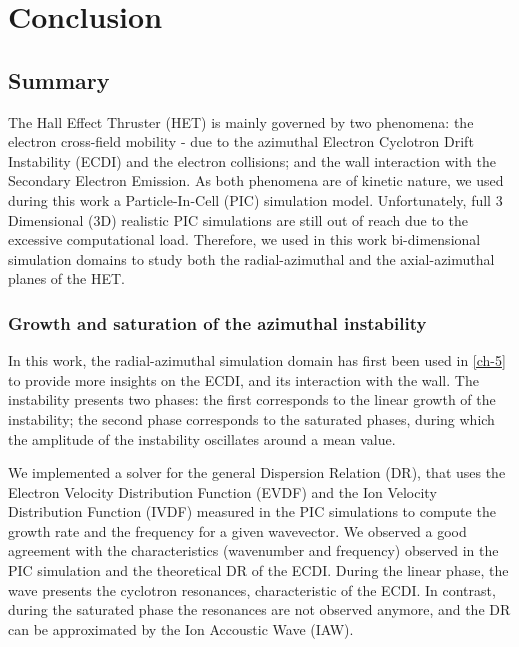 
\chapter{Conclusion}
\label{ch-conclusion}

\section{Summary}

The Hall Effect Thruster (HET) is mainly governed by two phenomena\string: the electron cross-field mobility - due to the azimuthal Electron Cyclotron Drift Instability (ECDI) and the electron collisions; and the wall interaction with the Secondary Electron Emission.
As both phenomena are of kinetic nature, we used during this work a Particle-In-Cell (PIC) simulation model.
Unfortunately, full 3 Dimensional (3D) realistic PIC simulations are still out of reach due to the excessive computational load.
Therefore, we used in this work bi-dimensional simulation domains to study both the radial-azimuthal and the axial-azimuthal planes of the HET.

\subsection{Growth and saturation of the azimuthal instability}

In this work, the radial-azimuthal simulation domain has first been used in \cref{ch-5} to provide more insights on the \ac{ECDI}, and its interaction with the wall.
The instability presents two phases\string: the first corresponds to the linear growth of the instability; the second phase corresponds to the saturated phases, during which the amplitude of the instability oscillates around a mean value.

We implemented a solver for the general Dispersion Relation (DR), that uses the Electron Velocity Distribution Function (EVDF) and the Ion Velocity Distribution Function (IVDF) measured in the PIC simulations to compute the growth rate and the frequency for a given wavevector.
We observed a good agreement with the characteristics (wavenumber and frequency) observed in the \ac{PIC} simulation and the theoretical DR of the ECDI.
During the linear phase, the wave presents the cyclotron resonances, characteristic of the ECDI.
In contrast, during the saturated phase the resonances are not observed anymore, and the DR can be approximated by the Ion Accoustic Wave (IAW).

